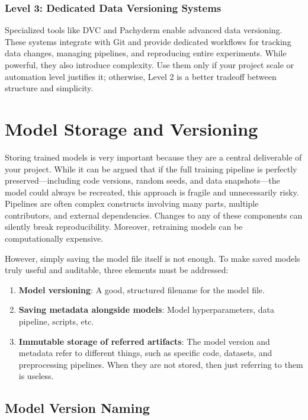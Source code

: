 \documentclass[12pt,openany]{book}
\begin{document}
\subsection*{Level 3: Dedicated Data Versioning Systems}

Specialized tools like DVC and Pachyderm enable advanced data versioning. These systems integrate with Git and provide dedicated workflows for tracking data changes, managing pipelines, and reproducing entire experiments. While powerful, they also introduce complexity. Use them only if your project scale or automation level justifies it; otherwise, Level 2 is a better tradeoff between structure and simplicity.




\chapter{Model Storage and Versioning}

Storing trained models is very important because they are a central deliverable of your project. While it can be argued that if the full training pipeline is perfectly preserved—including code versions, random seeds, and data snapshots—the model could always be recreated, this approach is fragile and unnecessarily risky. Pipelines are often complex constructs involving many parts, multiple contributors, and external dependencies. Changes to any of these components can silently break reproducibility. Moreover, retraining models can be computationally expensive. \newline

However, simply saving the model file itself is not enough. To make saved models truly useful and auditable, three elements must be addressed:
\begin{enumerate}
    \item \textbf{Model versioning}: A good, structured filename for the model file.
    \item \textbf{Saving metadata alongside models}: Model hyperparameters, data pipeline, scripts, etc.
    \item \textbf{Immutable storage of referred artifacts}: The model version and metadata refer to different things, such as specific code, datasets, and preprocessing pipelines. When they are not stored, then just referring to them is useless.
\end{enumerate}



\section{Model Version Naming}
\end{document}
